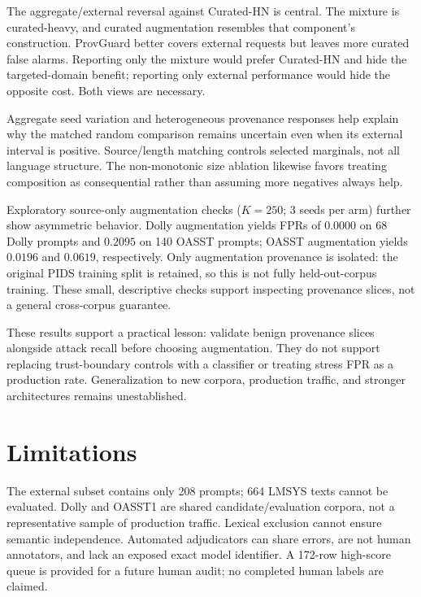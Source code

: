 \documentclass[conference]{IEEEtran}
\newcommand{\NWithheld}{664}
\newcommand{\NExternal}{208}
\newcommand{\HardPGFlagN}{172}
\newcommand{\SourceDollyDollyFPR}{0.0000}
\newcommand{\SourceDollyOasstFPR}{0.2095}
\newcommand{\SourceOasstDollyFPR}{0.0196}
\newcommand{\SourceOasstOasstFPR}{0.0619}
\newcommand{\SourceSeedN}{3}
\newcommand{\NDollyExternal}{68}
\newcommand{\NOasstExternal}{140}
\begin{document}
The aggregate/external reversal against Curated-HN is central. The mixture is curated-heavy, and curated augmentation resembles that component's construction. ProvGuard better covers external requests but leaves more curated false alarms. Reporting only the mixture would prefer Curated-HN and hide the targeted-domain benefit; reporting only external performance would hide the opposite cost. Both views are necessary.

Aggregate seed variation and heterogeneous provenance responses help explain why the matched random comparison remains uncertain even when its external interval is positive. Source/length matching controls selected marginals, not all language structure. The non-monotonic size ablation likewise favors treating composition as consequential rather than assuming more negatives always help.

Exploratory source-only augmentation checks ($K=250$; \SourceSeedN{} seeds per arm) further show asymmetric behavior. Dolly augmentation yields FPRs of $\SourceDollyDollyFPR$ on \NDollyExternal{} Dolly prompts and $\SourceDollyOasstFPR$ on \NOasstExternal{} OASST prompts; OASST augmentation yields $\SourceOasstDollyFPR$ and $\SourceOasstOasstFPR$, respectively. Only augmentation provenance is isolated: the original PIDS training split is retained, so this is not fully held-out-corpus training. These small, descriptive checks support inspecting provenance slices, not a general cross-corpus guarantee.

These results support a practical lesson: validate benign provenance slices alongside attack recall before choosing augmentation. They do not support replacing trust-boundary controls with a classifier or treating stress FPR as a production rate. Generalization to new corpora, production traffic, and stronger architectures remains unestablished.

\section{Limitations}
The external subset contains only \NExternal{} prompts; \NWithheld{} LMSYS texts cannot be evaluated. Dolly and OASST1 are shared candidate/evaluation corpora, not a representative sample of production traffic. Lexical exclusion cannot ensure semantic independence. Automated adjudicators can share errors, are not human annotators, and lack an exposed exact model identifier. A \HardPGFlagN{}-row high-score queue is provided for a future human audit; no completed human labels are claimed.
\end{document}
